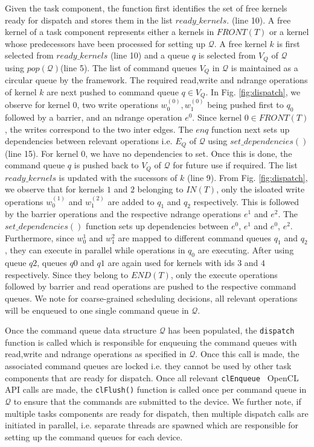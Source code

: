 	Given the task component, the function first identifies the set of free kernels ready for dispatch and stores them in the list $ready\_kernels$. (line 10). A free kernel of a task component represents either a kernels in $FRONT(T)$ or a kernel whose predecessors have been processed for setting up $\mathcal{Q}$. A free kernel $k$ is first selected from $ready\_kernels$ (line 10) and a queue $q$ is selected from $V_Q$ of $\mathcal{Q}$ using $pop(\mathcal{Q})$(line 5). The list of command queues $V_Q$ in $\mathcal{Q}$ is maintained as a circular queue by the framework. The required read,write and ndrange operations of kernel $k$ are next pushed to command queue $q \in V_Q$. In Fig. \ref{fig:dispatch}, we observe for kernel $0$, two write operations $w_0^{(0)},w_1^{(0)}$ being pushed first to $q_0$ followed by a barrier, and an ndrange operation $e^{0}$. Since kernel $0 \in FRONT(T)$, the writes correspond to the two inter edges. The $enq$ function next sets up dependencies between relevant operations i.e. $E_Q$ of $\mathcal{Q}$ using $set\_dependencies()$ (line 15). For kernel $0$, we have no dependencies to set. Once this is done, the command queue $q$ is pushed back to $V_Q$ of $\mathcal{Q}$ for future use if required. The list $ready\_kernels$ is updated with the sucessors of $k$ (line 9). From Fig. \ref{fig:dispatch}, we observe that for kernels $1$ and $2$ belonging to $IN(T)$, only the isloated write operations $w_0^{(1)}$ and  $w_1^{(2)}$ are added to $q_1$ and $q_2$ respectively. This is followed by the barrier operations and the respective ndrange operations $e^{1}$ and $e^{2}$. The $set\_dependencies()$ function sets up dependencies between $e^{0}$, $e^{1}$ and $e^{0}$, $e^{2}$. Furthermore, since $w_0^{1}$ and $w_1^{2}$ are mapped to different command queues $q_1$ and $q_2$, they can execute in parallel while operations in $q_0$ are executing. After using queue $q2$, queues $q0$ and $q1$ are again used   for kernels with ids $3$ and $4$ respectively. Since they belong to $END(T)$, only the execute operations followed by barrier and read operations are pushed to the respective command queues. We note for coarse-grained scheduling decisions,  all relevant operations will be enqueued to one single command queue in $\mathcal{Q}$.
	\par Once the command queue data structure $\mathcal{Q}$ has been populated, the {\tt dispatch} function is called which is responsible for enqueuing the command queues with read,write and ndrange operations as specified in $\mathcal{Q}$. Once this call is made, the associated command queues are locked i.e. they cannot be used by other task components that are ready for dispatch.  Once all relevant {\tt clEnqueue } OpenCL API calls are made, the {\tt clFlush()} function is called once per command queue in $\mathcal{Q}$ to ensure that the commands are submitted to the device. We further note, if multiple tasks components are ready for dispatch, then multiple {dispatch} calls are initiated in parallel, i.e. separate threads are spawned which are responsible for setting up the command queues for each device.
